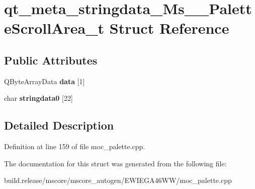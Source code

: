 \hypertarget{structqt__meta__stringdata___ms_____palette_scroll_area__t}{}\section{qt\+\_\+meta\+\_\+stringdata\+\_\+\+Ms\+\_\+\+\_\+\+Palette\+Scroll\+Area\+\_\+t Struct Reference}
\label{structqt__meta__stringdata___ms_____palette_scroll_area__t}
\subsection*{Public Attributes}
\begin{DoxyCompactItemize}
\item 
\mbox{\label{structqt__meta__stringdata___ms_____palette_scroll_area__t_a9374a09629b1c0c8d4e589b272771ccd}} 
Q\+Byte\+Array\+Data {\bfseries data} \mbox{[}1\mbox{]}
\item 
\mbox{\label{structqt__meta__stringdata___ms_____palette_scroll_area__t_acf529656db8d2f547733614dff6c60bf}} 
char {\bfseries stringdata0} \mbox{[}22\mbox{]}
\end{DoxyCompactItemize}


\subsection{Detailed Description}


Definition at line 159 of file moc\+\_\+palette.\+cpp.



The documentation for this struct was generated from the following file\+:\begin{DoxyCompactItemize}
\item 
build.\+release/mscore/mscore\+\_\+autogen/\+E\+W\+I\+E\+G\+A46\+W\+W/moc\+\_\+palette.\+cpp\end{DoxyCompactItemize}
